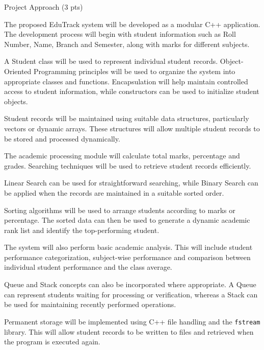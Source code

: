 \documentclass[11pt,a4paper]{article}
\newcommand{\blueheading}[1]{%
  {\sffamily\color{TitleBlue}\fontsize{15}{18}\selectfont #1}%
}
\begin{document}
\vspace{7mm}
\blueheading{Project Approach (3 pts)}

\vspace{3mm}
\begin{answerbox}
The proposed EduTrack system will be developed as a modular C++ application. The development process will begin with student information such as Roll Number, Name, Branch and Semester, along with marks for different subjects.

A Student class will be used to represent individual student records. Object-Oriented Programming principles will be used to organize the system into appropriate classes and functions. Encapsulation will help maintain controlled access to student information, while constructors can be used to initialize student objects.

Student records will be maintained using suitable data structures, particularly vectors or dynamic arrays. These structures will allow multiple student records to be stored and processed dynamically.

The academic processing module will calculate total marks, percentage and grades. Searching techniques will be used to retrieve student records efficiently.

Linear Search can be used for straightforward searching, while Binary Search can be applied when the records are maintained in a suitable sorted order.

Sorting algorithms will be used to arrange students according to marks or percentage. The sorted data can then be used to generate a dynamic academic rank list and identify the top-performing student.

The system will also perform basic academic analysis. This will include student performance categorization, subject-wise performance and comparison between individual student performance and the class average.

Queue and Stack concepts can also be incorporated where appropriate. A Queue can represent students waiting for processing or verification, whereas a Stack can be used for maintaining recently performed operations.

Permanent storage will be implemented using C++ file handling and the \texttt{fstream} library. This will allow student records to be written to files and retrieved when the program is executed again.


\end{answerbox}
\end{document}
